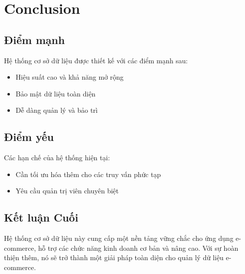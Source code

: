 \chapter{Conclusion}

\section{Điểm mạnh}

Hệ thống cơ sở dữ liệu được thiết kế với các điểm mạnh sau:
\begin{itemize}
  \item Hiệu suất cao và khả năng mở rộng
  \item Bảo mật dữ liệu toàn diện
  \item Dễ dàng quản lý và bảo trì
\end{itemize}

\section{Điểm yếu}

Các hạn chế của hệ thống hiện tại:
\begin{itemize}
  \item Cần tối ưu hóa thêm cho các truy vấn phức tạp
  \item Yêu cầu quản trị viên chuyên biệt
\end{itemize}

\section{Kết luận Cuối}

Hệ thống cơ sở dữ liệu này cung cấp một nền tảng vững chắc cho ứng dụng e-commerce, hỗ trợ các chức năng kinh doanh cơ bản và nâng cao. Với sự hoàn thiện thêm, nó sẽ trở thành một giải pháp toàn diện cho quản lý dữ liệu e-commerce.